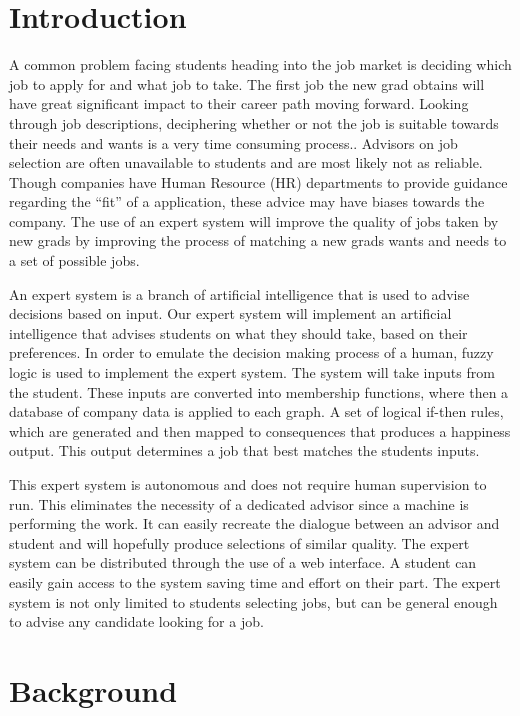 \documentclass[12pt,fleqn,reqno,letterpaper]{article}
\begin{document}
\clearpage
\section{Introduction}
A common problem facing students heading into the job market is deciding which job to apply for and what job to take.  The first job the new grad obtains will have great significant impact to their career path moving forward.  Looking through job descriptions, deciphering whether or not the job is suitable towards their needs and wants is a very time consuming process..  Advisors on job selection are often unavailable to students and are most likely not as reliable.  Though companies have Human Resource (HR) departments to provide guidance regarding the “fit” of a application, these advice may have biases towards the company.  The use of an expert system will improve the quality of jobs taken by new grads by improving the process of matching a new grads wants and needs to a set of possible jobs.

An expert system is a branch of artificial intelligence that is used to advise decisions based on input.  Our expert system will implement an artificial intelligence that advises students on what they should take, based on their preferences.  In order to emulate the decision making process of a human, fuzzy logic is used to implement the expert system.  The system will take inputs from the student.  These inputs are converted into membership functions, where then a database of company data is applied to each graph. A set of logical if-then rules, which are generated and then mapped to consequences that produces a happiness output.  This output determines a job that best matches the students inputs.

This expert system is autonomous and does not require human supervision to run.  This eliminates the necessity of a dedicated advisor since a machine is performing the work.  It can easily recreate the dialogue between an advisor and student and will hopefully produce selections of similar quality.  The expert system can be distributed through the use of a web interface.  A student can easily gain access to the system saving time and effort on their part.  The expert system is not only limited to students selecting jobs, but can be general enough to advise any candidate looking for a job.

\section{Background}
\end{document}
